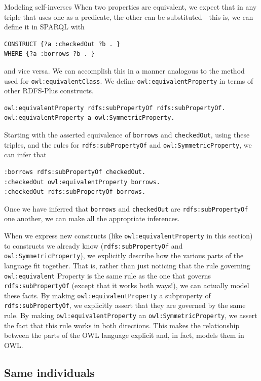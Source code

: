 \begin{challenge}{Modeling self-inverses}
When two properties are equivalent, we expect that in any triple that
uses one as a predicate, the other can be substituted---this is, we can
define it in SPARQL with

\begin{lstlisting}
CONSTRUCT {?a :checkedOut ?b . }
WHERE {?a :borrows ?b . }
\end{lstlisting}

and vice versa. We can accomplish this in a manner analogous to the
method used for \texttt{owl:equivalentClass}. We define \texttt{owl:equivalentProperty} in
terms of other RDFS-Plus constructs.

\begin{lstlisting}
owl:equivalentProperty rdfs:subPropertyOf rdfs:subPropertyOf.
owl:equivalentProperty a owl:SymmetricProperty.
\end{lstlisting}

Starting with the asserted equivalence of \texttt{borrows} and \texttt{checkedOut}, using
these triples, and the rules for \texttt{rdfs:subPropertyOf} and
\texttt{owl:SymmetricProperty}, we can infer that

\begin{lstlisting}
:borrows rdfs:subPropertyOf checkedOut.
:checkedOut owl:equivalentProperty borrows.
:checkedOut rdfs:subPropertyOf borrows.
\end{lstlisting}

Once we have inferred that \texttt{borrows} and \texttt{checkedOut} are \texttt{rdfs:subPropertyOf}
one another, we can make all the appropriate inferences.

When we express new constructs (like \texttt{owl:equivalentProperty} in this
section) to constructs we already know (\texttt{rdfs:subPropertyOf} and
\texttt{owl:SymmetricProperty}), we explicitly describe how the various parts of
the language fit together. That is, rather than just noticing that the
rule governing \texttt{owl:equivalent} Property is the same rule as the one that
governs \texttt{rdfs:subPropertyOf} (except that it works both ways!), we can
actually model these facts. By making \texttt{owl:equivalentProperty} a
subproperty of \texttt{rdfs:subPropertyOf}, we explicitly assert that they are
governed by the same rule. By making \texttt{owl:equivalentProperty} an
\texttt{owl:SymmetricProperty}, we assert the fact that this rule
works in both directions. This makes the relationship between the parts
of the OWL language explicit and, in fact, models them in OWL.

\subsection{Same individuals}


\end{challenge}
